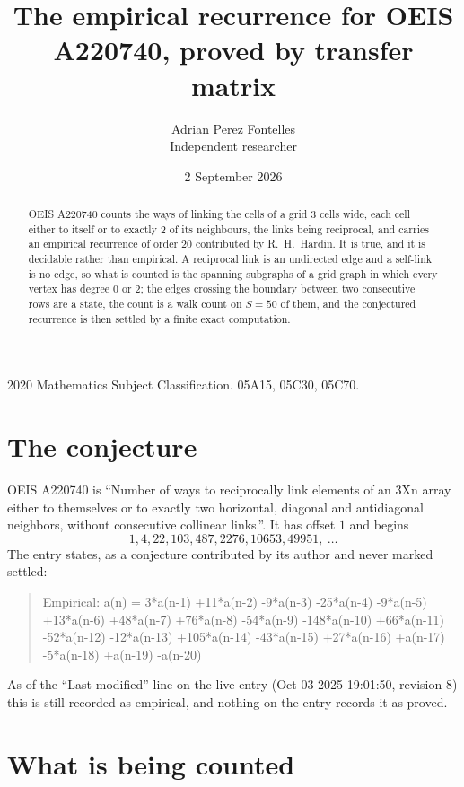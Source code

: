 \documentclass[11pt,a4paper]{article}
\title{The empirical recurrence for OEIS A220740, proved by transfer matrix}
\author{Adrian Perez Fontelles\\ \small Independent researcher}
\date{2 September 2026}
\theoremstyle{plain}
\theoremstyle{definition}
\begin{document}
\maketitle

\begin{abstract}
OEIS A220740 counts the ways of linking the cells of a grid $3$ cells wide, each cell either to
itself or to exactly $2$ of its neighbours, the links being reciprocal, and carries an
empirical recurrence of order $20$ contributed by R.~H.~Hardin. It is true, and it is
decidable rather than empirical. A reciprocal link is an undirected edge and a self-link is
no edge, so what is counted is the spanning subgraphs of a grid graph in which every vertex
has degree $0$ or $2$; the edges crossing the boundary between two consecutive rows are a
state, the count is a walk count on $S=50$ of them, and the conjectured recurrence is then
settled by a finite exact computation.
\end{abstract}

\noindent\small 2020 Mathematics Subject Classification. 05A15, 05C30, 05C70.\normalsize

\section{The conjecture}

OEIS A220740 is ``Number of ways to reciprocally link elements of an 3Xn array either to themselves or to exactly two horizontal, diagonal and antidiagonal neighbors, without consecutive collinear links.''. It has offset $1$ and begins
\[
1, 4, 22, 103, 487, 2276, 10653, 49951,\ \dots
\]
The entry states, as a conjecture contributed by its author and never marked settled:
\begin{quote}
Empirical: a(n) = 3*a(n-1) +11*a(n-2) -9*a(n-3) -25*a(n-4) -9*a(n-5) +13*a(n-6) +48*a(n-7) +76*a(n-8) -54*a(n-9) -148*a(n-10) +66*a(n-11) -52*a(n-12) -12*a(n-13) +105*a(n-14) -43*a(n-15) +27*a(n-16) +a(n-17) -5*a(n-18) +a(n-19) -a(n-20)
\end{quote}
As of the ``Last modified'' line on the live entry (Oct 03 2025 19:01:50, revision 8) this is still
recorded as empirical, and nothing on the entry records it as proved.

\section{What is being counted}
\end{document}
